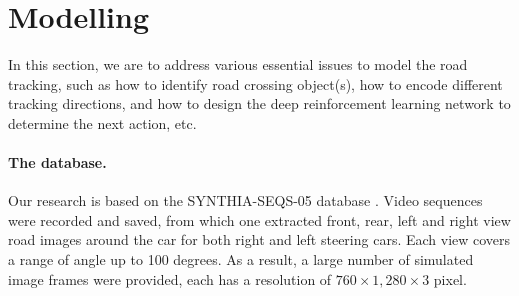 \documentclass{svproc}
\begin{document}
	
	\section{Modelling}
	In this section, we are to address various essential issues to model the road tracking, such as how to identify road crossing object(s), how to encode different tracking directions, and how to design the deep reinforcement learning network to determine the next action, etc. 
	\paragraph{The database.} Our research is based on the SYNTHIA-SEQS-05 database \cite{Ros2016TheSYNTHIA}. Video sequences were recorded and saved, from which one extracted front, rear, left and right view road images around the car for both right and left steering cars. Each view covers a range of angle up to 100 degrees. As a result, a large number of simulated image frames were provided, each has a resolution of $760 \times 1,280 \times 3$ pixel. 
	
\end{document}
